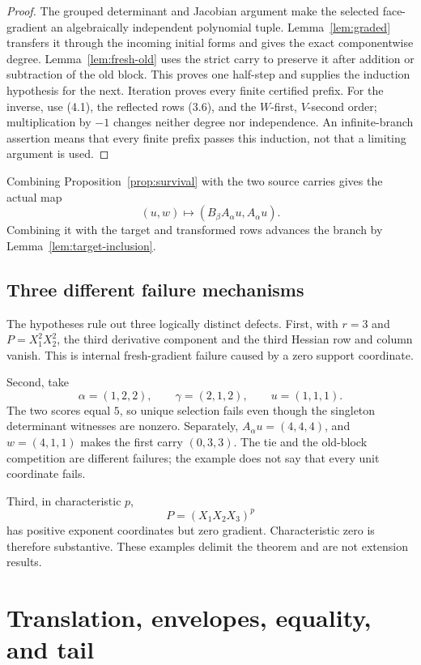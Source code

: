 \documentclass[11pt]{article}
\theoremstyle{definition}
\theoremstyle{remark}
\begin{document}
\begin{proof}
The grouped determinant and Jacobian argument make the selected
face-gradient an algebraically independent polynomial tuple.
Lemma~\ref{lem:graded} transfers it through the incoming initial forms and
gives the exact componentwise degree.  Lemma~\ref{lem:fresh-old} uses the
strict carry to preserve it after addition or subtraction of the old block.
This proves one half-step and supplies the induction hypothesis for the
next.  Iteration proves every finite certified prefix.  For the inverse,
use (4.1), the reflected rows (3.6), and the \(W\)-first, \(V\)-second
order; multiplication by \(-1\) changes neither degree nor independence.
An infinite-branch assertion means that every finite prefix passes this
induction, not that a limiting argument is used.
\end{proof}

Combining Proposition~\ref{prop:survival} with the two source carries gives
the actual map
\[
 (u,w)\longmapsto
 (B_\beta A_\alpha u,A_\alpha u).
\tag{4.7}
\]
Combining it with the target and transformed rows advances the branch by
Lemma~\ref{lem:target-inclusion}.

\subsection{Three different failure mechanisms}

The hypotheses rule out three logically distinct defects.  First, with
\(r=3\) and \(P=X_1^2X_2^2\), the third derivative component and the third
Hessian row and column vanish.  This is internal fresh-gradient failure
caused by a zero support coordinate.

Second, take
\[
 \alpha=(1,2,2),\qquad \gamma=(2,1,2),\qquad u=(1,1,1).
\]
The two scores equal \(5\), so unique selection fails even though the
singleton determinant witnesses are nonzero.  Separately,
\(A_\alpha u=(4,4,4)\), and \(w=(4,1,1)\) makes the first carry
\((0,3,3)\).  The tie and the old-block competition are different
failures; the example does not say that every unit coordinate fails.

Third, in characteristic \(p\),
\[
 P=(X_1X_2X_3)^p
\]
has positive exponent coordinates but zero gradient.  Characteristic zero
is therefore substantive.  These examples delimit the theorem and are not
extension results.

\section{Translation, envelopes, equality, and tail}
\end{document}
